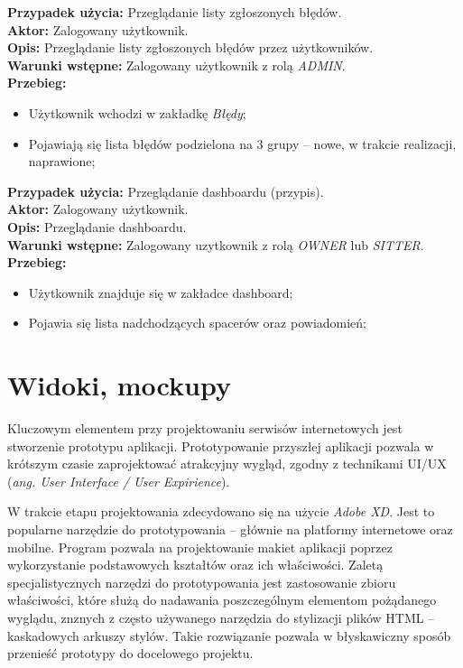 \noindent
\textbf{Przypadek użycia:} Przeglądanie listy zgłoszonych błędów. \\
\textbf{Aktor:} Zalogowany użytkownik. \\
\textbf{Opis:} Przeglądanie listy zgłoszonych błędów przez użytkowników. \\
\textbf{Warunki wstępne:} Zalogowany użytkownik z rolą \textit{ADMIN}. \\
\textbf{Przebieg:}
\begin{itemize}[leftmargin=1cm]
    \item Użytkownik wchodzi w zakładkę \textit{Błędy};
    \item Pojawiają się lista błędów podzielona na 3 grupy -- nowe, w trakcie realizacji, naprawione;
\end{itemize}

\noindent
\textbf{Przypadek użycia:} Przeglądanie dashboardu (przypis). \\
\textbf{Aktor:} Zalogowany użytkownik. \\
\textbf{Opis:} Przeglądanie dashboardu. \\
\textbf{Warunki wstępne:} Zalogowany uzytkownik z rolą \textit{OWNER} lub \textit{SITTER}. \\
\textbf{Przebieg:}
\begin{itemize}[leftmargin=1cm]
    \item Użytkownik znajduje się w zakładce dashboard;
    \item Pojawia się lista nadchodzących spacerów oraz powiadomień;
\end{itemize}

\section{Widoki, mockupy}
Kluczowym elementem przy projektowaniu serwisów internetowych jest stworzenie prototypu aplikacji. Prototypowanie przyszłej aplikacji pozwala w krótszym czasie zaprojektować atrakcyjny wygląd, zgodny z technikami UI/UX (\textit{ang. User Interface / User Expirience}).

W trakcie etapu projektowania zdecydowano się na użycie \textit{Adobe XD}. Jest to popularne narzędzie do prototypowania -- głównie na platformy internetowe oraz mobilne. Program pozwala na projektowanie makiet aplikacji poprzez wykorzystanie podstawowych kształtów oraz ich właściwości. Zaletą specjalistycznych narzędzi do prototypowania jest zastosowanie zbioru właściwości, które służą do nadawania poszczególnym elementom pożądanego wyglądu, znznych z często używanego narzędzia do stylizacji plików HTML -- kaskadowych arkuszy stylów. Takie rozwiązanie pozwala w błyskawiczny sposób przenieść prototypy do docelowego projektu.

